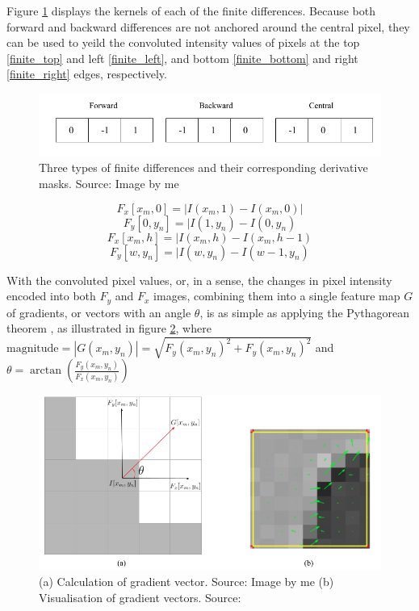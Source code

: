 Figure \ref{fig:finite_differences} displays the kernels of each of the finite differences. Because both forward and backward differences are not anchored around the central pixel, they can be used to yeild the convoluted intensity values of pixels at the top \ref{finite_top} and left \ref{finite_left}, and bottom \ref{finite_bottom} and right \ref{finite_right} edges, respectively.

\begin{figure}
    \centering
    \includegraphics[width=0.75\linewidth]{images/finite_differences.png}
    \caption{Three types of finite differences and their corresponding derivative masks. Source: Image by me}
    \label{fig:finite_differences}
\end{figure}

\begin{equation}
    \label{finite_top}
    F_{x}[x_{m},0] =  | I(x_{m},1)-I(x_{m},0) | 
\end{equation}
\begin{equation}
    \label{finite_left}
    F_{y}[0,y_{n}] =  | I(1,y_{n})-I(0,y_{n}) 
\end{equation}
\begin{equation}
    \label{finite_bottom}
    F_{x}[x_{m},h] =  | I(x_{m},h)-I(x_{m},h-1) 
\end{equation}
\begin{equation}
    \label{finite_right}
    F_{y}[w,y_{n}] =  | I(w,y_{n})-I(w-1,y_{n}) 
\end{equation}

With the convoluted pixel values, or, in a sense, the changes in pixel intensity encoded into both $F_y$ and $F_x$ images, combining them into a single feature map $G$ of gradients, or vectors with an angle $\theta$, is as simple as applying the Pythagorean theorem \cite{shidlovskiy_2020_reducing}, as illustrated in figure \ref{fig:pythagorean}, where $ \text{magnitude} = | G(x_{m},y_{n}) | = \sqrt{ F_{y}(x_{m},y_{n})^2+F_{y}(x_{m},y_{n})^2 }$ and $\theta = \arctan \left( \frac{F_{y}(x_{m},y_{n})}{F_{x}(x_{m},y_{n})} \right) $

\begin{figure}
    \centering
    \includegraphics[width=0.75\linewidth]{images/pythagorean.png}
    \caption{(a) Calculation of gradient vector. Source: Image by me (b) Visualisation of gradient vectors. Source: \cite{shidlovskiy_2020_reducing}}
    \label{fig:pythagorean}
\end{figure}

